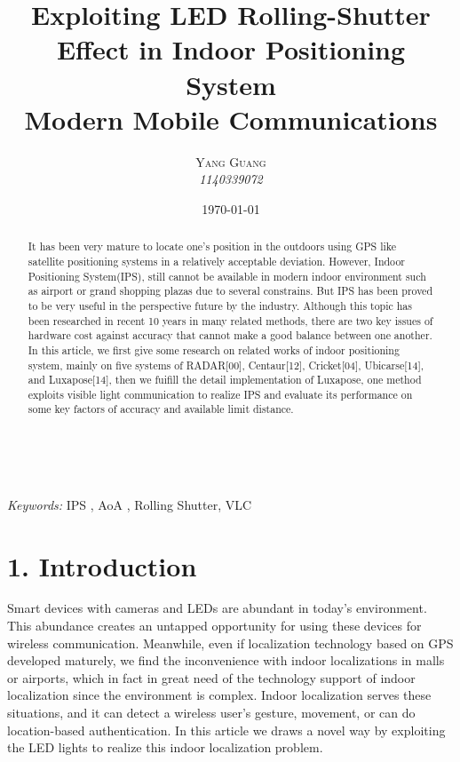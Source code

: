 \documentclass[a4paper, 11pt]{article} %
\title{\textbf{Exploiting LED Rolling-Shutter Effect in Indoor Positioning System}\\ %
Modern Mobile Communications} %
\author{\textsc{Yang Guang} %
\\{\textit{1140339072}}} %
\date{\today} %
\makeatletter
\renewcommand{\maketitle}{ %
\begin{flushright} %
{\LARGE\@title} %

\vspace{50pt} %

{\large\@author} %
\\\@date %

\vspace{40pt} %
\end{flushright}
}
\makeatother
\begin{document}
\maketitle %



\begin{abstract}
It has been very mature to locate one's position in the outdoors using GPS like satellite positioning systems in a relatively acceptable deviation. However, Indoor Positioning System(IPS), still cannot be available in modern indoor environment such as airport or grand shopping plazas due to several constrains. But IPS has been proved to be very useful in the perspective future by the industry. Although this topic has been researched in recent 10 years in many related methods, there are two key issues of hardware cost against accuracy that cannot make a good balance between one another. In this article, we first give some research on related works of indoor positioning system, mainly on five systems of RADAR[00], Centaur[12], Cricket[04], Ubicarse[14], and Luxapose[14], then we fuifill the detail implementation of Luxapose, one method exploits visible light communication to realize IPS and evaluate its performance on some key factors of accuracy and available limit distance.
\end{abstract}

\hspace*{3,6mm}\textit{Keywords:} IPS , AoA , Rolling Shutter, VLC %

\vspace{30pt} %


\section*{1. Introduction}

 Smart devices with cameras and LEDs are abundant in today's environment. This abundance creates an untapped opportunity for using these devices for wireless communication. Meanwhile, even if localization technology based on GPS developed maturely, we find the inconvenience with indoor localizations in malls or airports, which in fact in great need of the technology support of indoor localization since the environment is complex. Indoor localization serves these situations, and it can detect a wireless user's gesture, movement, or can do location-based authentication. In this article we draws a novel way by exploiting the LED lights to realize this indoor localization problem. 
\end{document}
